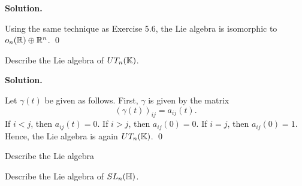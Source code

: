 \documentclass[12pt]{book}
\theoremstyle{definition}
\newenvironment{solution}
{%
  \par\noindent\textbf{Solution.}\quad
}
{%
  \qed\par
}
\begin{document}
\begin{solution}
  Using the same technique as Exercise 5.6, the Lie algebra is isomorphic to $o_n(\mathbb{R}) \oplus \mathbb{R}^n$.
\end{solution}

\begin{taggedexercise}[\textcolor{green}{Complete}]
  Describe the Lie algebra of $UT_n(\mathbb{K})$.
\end{taggedexercise}

\begin{solution}
  Let $\gamma(t)$ be given as follows.
  First, $\gamma$ is given by the matrix
  \[(\gamma(t))_{ij} = a_{ij}(t).\]
  If $i < j$, then $a_{ij}(t) = 0$.
  If $i > j$, then $a_{ij}(0) = 0$.
  If $i = j$, then $a_{ij}(0) = 1$.
  Hence, the Lie algebra is again $UT_n(\mathbb{K})$.
\end{solution}

\begin{taggedexercise}[\textcolor{red}{TODO}]
  Describe the Lie algebra 
\end{taggedexercise}

\begin{taggedexercise}[\textcolor{red}{TODO}]

\end{taggedexercise}

\begin{taggedexercise}[\textcolor{red}{TODO}]

\end{taggedexercise}

\begin{taggedexercise}[\textcolor{red}{TODO}]

\end{taggedexercise}

\begin{taggedexercise}[\textcolor{red}{TODO}]

\end{taggedexercise}

\begin{taggedexercise}[\textcolor{red}{TODO}]

\end{taggedexercise}

\begin{taggedexercise}[\textcolor{red}{TODO}]
  Describe the Lie algebra of $SL_n(\mathbb{H})$.
\end{taggedexercise}
\end{document}
